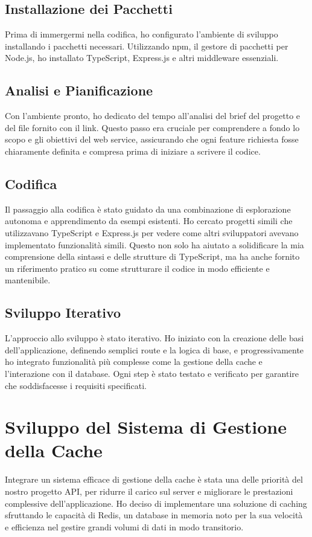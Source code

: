 \documentclass[12pt]{article}
\begin{document}
\subsection{Installazione dei Pacchetti}
Prima di immergermi nella codifica, ho configurato l'ambiente di sviluppo installando i pacchetti necessari. Utilizzando npm, il gestore di pacchetti per Node.js, ho installato TypeScript, Express.js e altri middleware essenziali.


\subsection{Analisi e Pianificazione}
Con l'ambiente pronto, ho dedicato del tempo all'analisi del brief del progetto e del file fornito con il link. Questo passo era cruciale per comprendere a fondo lo scopo e gli obiettivi del web service, assicurando che ogni feature richiesta fosse chiaramente definita e compresa prima di iniziare a scrivere il codice.

\subsection{ Codifica}
Il passaggio alla codifica è stato guidato da una combinazione di esplorazione autonoma e apprendimento da esempi esistenti. Ho cercato progetti simili che utilizzavano TypeScript e Express.js per vedere come altri sviluppatori avevano implementato funzionalità simili. Questo non solo ha aiutato a solidificare la mia comprensione della sintassi e delle strutture di TypeScript, ma ha anche fornito un riferimento pratico su come strutturare il codice in modo efficiente e mantenibile.

\subsection{ Sviluppo Iterativo}
L'approccio allo sviluppo è stato iterativo. Ho iniziato con la creazione delle basi dell'applicazione, definendo semplici route e la logica di base, e progressivamente ho integrato funzionalità più complesse come la gestione della cache e l'interazione con il database. Ogni step è stato testato e verificato per garantire che soddisfacesse i requisiti specificati.

\section{Sviluppo del Sistema di Gestione della Cache }
Integrare un sistema efficace di gestione della cache è stata una delle priorità del nostro progetto API, per ridurre il carico sul server e migliorare le prestazioni complessive dell'applicazione. Ho deciso di implementare una soluzione di caching sfruttando le capacità di Redis, un database in memoria noto per la sua velocità e efficienza nel gestire grandi volumi di dati in modo transitorio.
\end{document}
